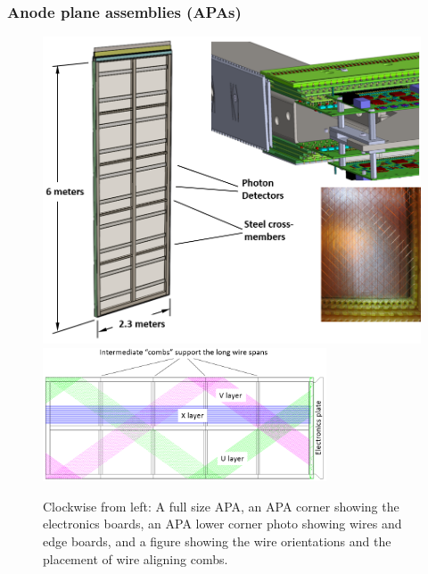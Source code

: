 
\subsubsection{Anode plane assemblies (APAs)}




\begin{figure}[!htb]
\centering
\begin{minipage}[b]{1.0\textwidth}
\begin{center}
\includegraphics[width=.75\textwidth]{figures/TPC_APA_1}
\includegraphics[width=0.75\textwidth]{figures/TPC_APA_2}
\end{center}
\end{minipage}
\caption{Clockwise from left: A full size APA, an APA corner showing the electronics boards, an APA lower corner photo showing wires and edge boards, and a figure showing the wire orientations and the placement of wire aligning combs. }
\label{fig:tpc_apa_overview} 
\end{figure}


